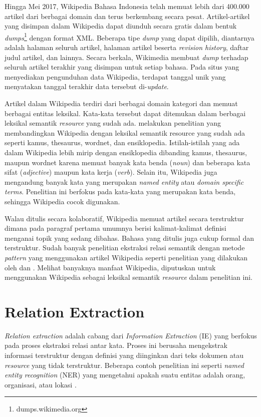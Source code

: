 Hingga Mei 2017, Wikipedia Bahasa Indonesia telah memuat lebih dari 400.000 artikel dari berbagai domain dan terus berkembang secara pesat. Artikel-artikel yang disimpan dalam Wikipedia dapat diunduh secara gratis dalam bentuk \textit{dumps}\footnote{dumps.wikimedia.org} dengan format XML. Beberapa tipe \textit{dump} yang dapat dipilih, diantarnya adalah halaman seluruh artikel, halaman artikel beserta \textit{revision history}, daftar judul artikel, dan lainnya. Secara berkala, Wikimedia membuat \textit{dump} terhadap seluruh artikel terakhir yang disimpan untuk setiap bahasa. Pada situs yang menyediakan pengunduhan data Wikipedia, terdapat tanggal unik yang menyatakan tanggal terakhir data tersebut di-\textit{update}.

Artikel dalam Wikipedia terdiri dari berbagai domain kategori dan memuat berbagai entitas leksikal. Kata-kata tersebut dapat ditemukan dalam berbagai leksikal semantik \textit{resource} yang sudah ada. \cite{zesch2007analyzing} melakukan penelitian yang membandingkan Wikipedia dengan leksikal semantik resource yang sudah ada seperti kamus, thesaurus, wordnet, dan ensiklopedia. Istilah-istilah yang ada dalam Wikipedia lebih mirip dengan ensiklopedia dibanding kamus, thesaurus, maupun wordnet karena memuat banyak kata benda (\textit{noun}) dan beberapa kata sifat (\textit{adjective}) maupun kata kerja (\textit{verb}). Selain itu, Wikipedia juga mengandung banyak kata yang merupakan \textit{named entity} atau \textit{domain specific terms}. Penelitian ini berfokus pada kata-kata yang merupakan kata benda, sehingga Wikipedia cocok digunakan. 

Walau ditulis secara kolaboratif, Wikipedia memuat artikel secara terstruktur dimana pada paragraf pertama umumnya berisi kalimat-kalimat definisi menganai topik yang sedang dibahas. Bahasa yang ditulis juga cukup formal dan terstruktur. Sudah banyak penelitian ekstraksi relasi semantik dengan metode \textit{pattern} yang menggunakan artikel Wikipedia seperti penelitian yang dilakukan oleh \cite{ruiz2005automatic} dan \cite{arnold2014extracting}. Melihat banyaknya manfaat Wikipedia, diputuskan untuk menggunakan Wikipedia sebagai leksikal semantik \textit{resource} dalam penelitian ini. 


\section{Relation Extraction}
\textit{Relation extraction} adalah cabang dari \textit{Information Extraction} (IE) yang berfokus pada proses ekstraksi relasi antar kata. Proses ini berusaha mengekstrak informasi terstruktur dengan definisi yang diinginkan dari teks dokumen atau \textit{resource} yang tidak terstruktur. Beberapa contoh penelitian ini seperti \textit{named entity recognition} (NER) yang mengetahui apakah suatu entitas adalah orang, organisasi, atau lokasi \citep{bikel1999algorithm}. 

